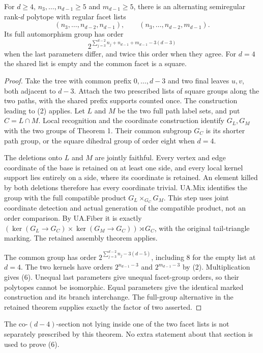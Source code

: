 \begin{theorem}
For $d\ge4$, $n_3,\ldots,n_{d-1}\ge5$ and $m_{d-1}\ge5$, there is an
alternating semiregular rank-$d$ polytope with regular facet lists
\[
 (n_3,\ldots,n_{d-2},n_{d-1}),\qquad
 (n_3,\ldots,n_{d-2},m_{d-1}).
\]
Its full automorphism group has order
\[
 2^{\sum_{j=3}^{d-2}n_j+n_{d-1}+m_{d-1}-3(d-3)}             \tag{6}
\]
when the last parameters differ, and twice this order when they agree.
For $d=4$ the shared list is empty and the common facet is a square.
\end{theorem}
\begin{proof}
Take the tree with common prefix $0,\ldots,d-3$ and two final leaves
$u,v$, both adjacent to $d-3$. Attach the two prescribed lists of square
groups along the two paths, with the shared prefix supports counted once.
The construction leading to (2) applies. Let $L$ and $M$ be the two full
path label sets, and put $C=L\cap M$.
Local recognition and the coordinate construction identify $G_L,G_M$ with
the two groups of Theorem 1. Their common subgroup $G_C$ is its shorter
path group, or the square dihedral group of order eight when $d=4$.

The deletions onto $L$ and $M$ are jointly faithful. Every vertex and edge
coordinate of the base is retained on at least one side, and every local
kernel support lies entirely on a side, where its coordinate is retained.
An element killed by both deletions therefore has every coordinate trivial.
UA.Mix identifies the group with the full compatible product
$G_L\times_{G_C}G_M$. This step uses joint coordinate detection and actual
generation of the compatible product, not an order comparison.
By UA.Fiber it is exactly
$(\ker(G_L\to G_C)\times\ker(G_M\to G_C))\rtimes G_C$, with the original
tail-triangle marking. The retained assembly theorem applies.

The common group has order
$2^{\sum_{j=3}^{d-2}n_j-3(d-5)}$, including $8$ for the empty list at
$d=4$. The two kernels have orders $2^{n_{d-1}-3}$ and
$2^{m_{d-1}-3}$ by (2). Multiplication gives (6). Unequal last parameters
give unequal facet-group orders, so their polytopes cannot be isomorphic.
Equal parameters give the identical marked construction and its branch
interchange. The full-group alternative in the retained theorem supplies
exactly the factor of two asserted.
\end{proof}

The co-$(d-4)$-section not lying inside one of the two facet lists is not
separately prescribed by this theorem. No extra statement about that section
is used to prove (6).

